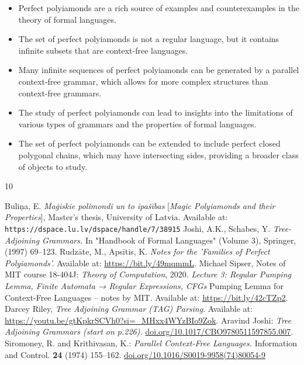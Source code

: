 \documentclass[a4paper,12pt]{article}
\begin{document}
\begin{itemize}
\item Perfect polyiamonds are a rich source of examples and counterexamples 
in the theory of formal languages.
\item The set of perfect polyiamonds is not a regular language, 
but it contains infinite subsets that are context-free languages.
\item Many infinite sequences of perfect polyiamonds can be generated by a parallel context-free 
grammar, which allows for more complex structures than context-free grammars. 
\item The study of perfect polyiamonds can lead to insights into the limitations 
of various types of grammars and the properties of formal languages.
\item The set of perfect polyiamonds can be extended to include perfect closed polygonal 
chains, which may have intersecting sides, providing a broader class of objects to study.
\end{itemize}




\begin{thebibliography}{10}

Buliņa, E. \textit{Maģiskie polimondi un to īpašības} [{\it Magic Polyiamonds and their Properties}], Master's thesis, University of Latvia. Available at: {\tt https://dspace.lu.lv/dspace/handle/7/38915}
Joshi, A.K., Schabes, Y.
{\it Tree-Adjoining Grammars.}
In "Handbook of Formal Languages" (Volume 3), Springer, (1997) 69--123.
Rudzāte, M., Apsītis, K.
{\it Notes for the 'Families of Perfect Polyiamonds'.} 
Available at: \url{https://bit.ly/49mqmmL}.
Michael Sipser, Notes of MIT course 18-404J: {\em Theory of Computation}, 2020.  
{\em Lecture 3: Regular Pumping Lemma, Finite Automata → Regular Expressions, CFGs}
Pumping Lemma for Context-Free Languages -- notes by MIT.
Available at: \url{https://bit.ly/42cTZp2}. 
Darcey Riley, {\em Tree Adjoining Grammar (TAG) Parsing}. Available at: 
\url{https://youtu.be/gtKpkrSCVh0?si=_MHxx4WYzBIo9Zok}. 
Aravind Joshi: {\em Tree Adjoining Grammars (start on p.226).}
\url{doi.org/10.1017/CBO9780511597855.007}.
Siromoney, R. and Krithivasan, K.: {\em Parallel Context-Free Languages.}
Information and Control. {\bf 24} (1974) 155--162. 
\url{doi.org/10.1016/S0019-9958(74)80054-9}
\end{thebibliography}
\end{document}
